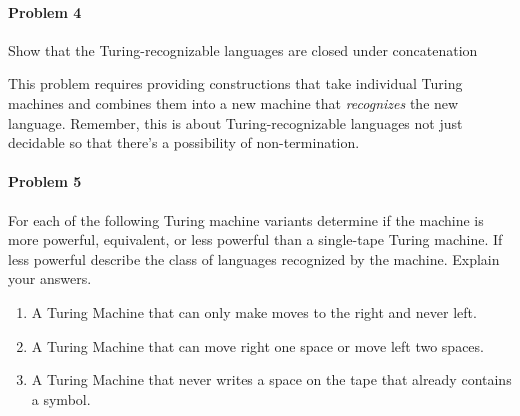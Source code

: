 \documentclass{article}
\begin{document}
\paragraph{Problem 4}
Show that the Turing-recognizable languages are closed under concatenation

This problem requires providing constructions that take individual Turing machines and combines 
them into a new machine that {\em recognizes} the new language. Remember, this is about 
Turing-recognizable languages not just decidable so that there's a possibility of non-termination.

\paragraph{Problem 5} For each of the following Turing machine variants determine if the machine
is more powerful, equivalent, or less powerful than a single-tape Turing machine. If less powerful
describe the class of languages recognized by the machine. Explain your answers.
\begin{enumerate}[\indent a)]
    \item A Turing Machine that can only make moves to the right and never left.
    \item A Turing Machine that can move right one space or move left two spaces.
    \item A Turing Machine that never writes a space on the tape that already contains a symbol.
\end{enumerate}
\end{document}
